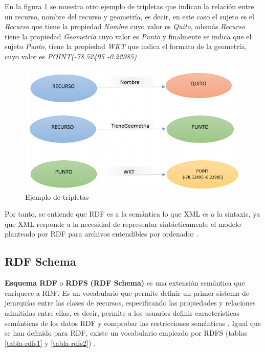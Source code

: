 En la figura \ref{fig:imagen1} se muestra otro ejemplo de tripletas que indican la relación entre un recurso, nombre del recurso y geometría, es decir, en este caso el sujeto es el \textit{Recurso} que tiene la propiedad \textit{Nombre} cuyo valor es \textit{Quito}, además \textit{Recurso} tiene la propiedad \textit{Geometría} cuyo valor es \textit{Punto} y finalmente se indica que el sujeto \textit{Punto}, tiene la propiedad \textit{WKT} que indica el formato de la geometría, cuyo valor es \textit{POINT(-78.52495 -0.22985)} \cite{coursera}. 

\begin{figure}[H]
	\centering
	\includegraphics[width=0.75\linewidth]{imagenes/capitulo3/Imagen1}
	\caption{Ejemplo de tripletas \cite{coursera}}
	\label{fig:imagen1}
\end{figure}

Por tanto, se entiende que RDF es a la semántica lo que XML es a la sintaxis, ya que XML responde a la necesidad de representar sintácticamente el modelo planteado por RDF para archivos entendibles por ordenador \cite{web-semantica-w3c}.


\subsection{RDF Schema}

\textbf{Esquema RDF} o \textbf{RDFS} \textbf{(RDF Schema)} es una extensión semántica que enriquece a RDF. Es un vocabulario que permite definir un primer sistema de jerarquías entre las clases de recursos, especificando las propiedades y relaciones admitidas entre ellas, es decir, permite a los usuarios definir características semánticas de los datos RDF y comprobar las restricciones semánticas \cite{web-semantica-w3c, libro-gis, aplicacion}. Igual que se han definido para RDF, existe un vocabulario empleado por RDFS (tablas \ref{tabla-rdfs1} y \ref{tabla-rdfs2}) \cite{tesis-otro}.



